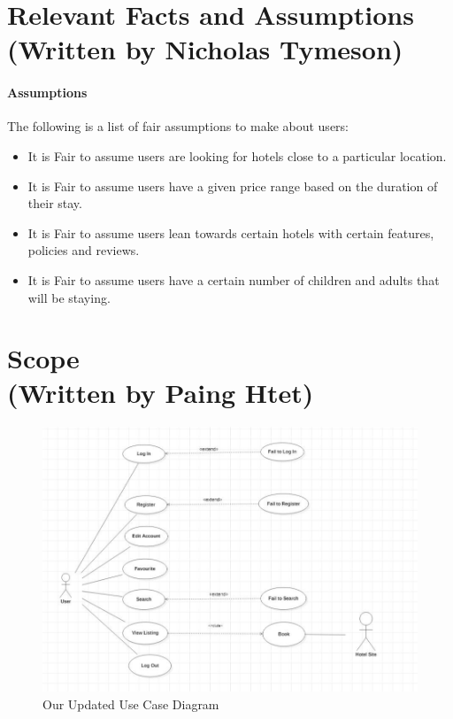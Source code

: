 \documentclass[]{article}
\begin{document}
\section{Relevant Facts and Assumptions\\ (Written by Nicholas Tymeson)}
\paragraph{Assumptions}
The following is a list of fair assumptions to make about users:
\begin{itemize}
    \item It is Fair to assume users are looking for hotels close to a particular location.
    \item It is Fair to assume users have a given price range based on the duration of their stay.
    \item It is Fair to assume users lean towards certain hotels with certain features, policies and reviews.
    \item It is Fair to assume users have a certain number of children and adults that will be staying.
\end{itemize}
  
\section{Scope \\(Written by Paing Htet)}
\begin{figure}[H]
    \centering
    \includegraphics[scale=0.4]{usecase.png}
    \caption{Our Updated Use Case Diagram}
\end{figure}
\end{document}
